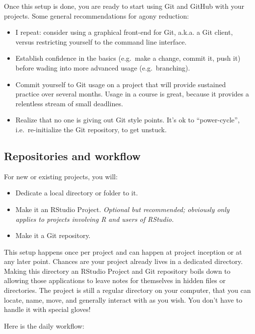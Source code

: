 \documentclass[12pt]{article}
\providecommand{\tightlist}{%
  \setlength{\itemsep}{0pt}\setlength{\parskip}{0pt}}
\begin{document}
Once this setup is done, you are ready to start using Git and GitHub
with your projects. Some general recommendations for agony reduction:

\begin{itemize}
\tightlist
\item
  I repeat: consider using a graphical front-end for Git, a.k.a. a Git
  client, versus restricting yourself to the command line interface.
\item
  Establish confidence in the basics (e.g.~make a change, commit it,
  push it) before wading into more advanced usage (e.g.~branching).
\item
  Commit yourself to Git usage on a project that will provide sustained
  practice over several months. Usage in a course is great, because it
  provides a relentless stream of small deadlines.
\item
  Realize that no one is giving out Git style points. It's ok to
  ``power-cycle'', i.e.~re-initialize the Git repository, to get
  unstuck.
\end{itemize}

\subsection{Repositories and workflow}\label{repositories-and-workflow}

For new or existing projects, you will:

\begin{itemize}
\tightlist
\item
  Dedicate a local directory or folder to it.
\item
  Make it an RStudio Project. \emph{Optional but recommended; obviously
  only applies to projects involving R and users of RStudio.}
\item
  Make it a Git repository.
\end{itemize}

This setup happens once per project and can happen at project inception
or at any later point. Chances are your project already lives in a
dedicated directory. Making this directory an RStudio Project and Git
repository boils down to allowing those applications to leave notes for
themselves in hidden files or directories. The project is still a
regular directory on your computer, that you can locate, name, move, and
generally interact with as you wish. You don't have to handle it with
special gloves!

Here is the daily workflow:
\end{document}
